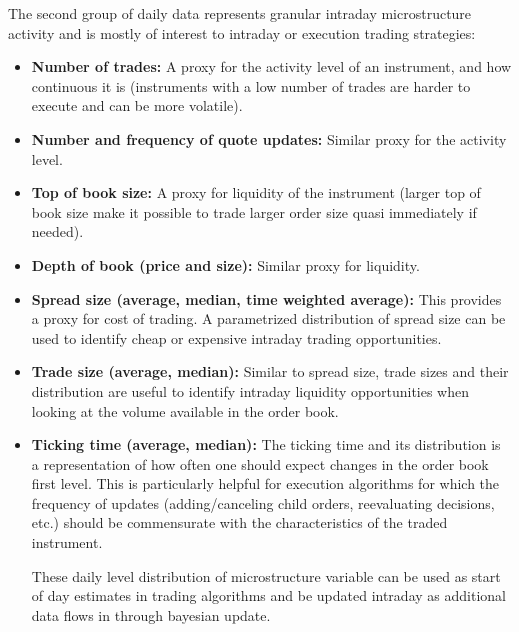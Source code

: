 The second group of daily data represents granular intraday microstructure activity and is mostly of interest to intraday or execution trading strategies:
        \begin{itemize}
        \item \textbf{Number of trades:} A proxy for the activity level of an instrument, and how continuous it is (instruments with a low number of trades are harder to execute and can be more volatile). 
        \item \textbf{Number and frequency of quote updates:} Similar proxy for the activity level.
        \item \textbf{Top of book size:} A proxy for liquidity of the instrument (larger top of book size make it possible to trade larger order size quasi immediately if needed).
        \item \textbf{Depth of book (price and size):} Similar proxy for liquidity.
        \item \textbf{Spread size (average, median, time weighted average):} This provides a proxy for cost of trading. A parametrized distribution of spread size can be used to identify cheap or expensive intraday trading opportunities.
        \item \textbf{Trade size (average, median):} Similar to spread size, trade sizes and their distribution are useful to identify intraday liquidity opportunities when looking at the volume available in the order book.
        \item \textbf{Ticking time (average, median):} The ticking time and its distribution is a representation of how often one should expect changes in the order book first level. This is particularly helpful for execution algorithms for which the frequency of updates (adding/canceling child orders, reevaluating decisions, etc.) should be commensurate with the characteristics of the traded instrument.
        
        These daily level distribution of microstructure variable can be used as start of day estimates in trading algorithms and be updated intraday as additional data flows in through bayesian update.
        \end{itemize}


